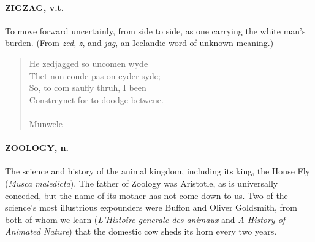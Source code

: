\documentclass[11pt]{article}
\begin{document}
\paragraph{ZIGZAG, v.t.}  To move forward uncertainly, from side to side, as one
carrying the white man's burden.  (From {\em zed}, {\em z}, and {\em jag}, an
Icelandic word of unknown meaning.)

\begin{quote}   He zedjagged so uncomen wyde \\
  Thet non coude pas on eyder syde; \\
  So, to com saufly thruh, I been \\
  Constreynet for to doodge betwene. \\
 \\
Munwele \end{quote}


\paragraph{ZOOLOGY, n.}  The science and history of the animal kingdom, including
its king, the House Fly ({\em Musca maledicta}).  The father of Zoology
was Aristotle, as is universally conceded, but the name of its mother
has not come down to us.  Two of the science's most illustrious
expounders were Buffon and Oliver Goldsmith, from both of whom we
learn ({\em L'Histoire generale des animaux} and {\em A History of Animated
Nature}) that the domestic cow sheds its horn every two years.
\end{document}
